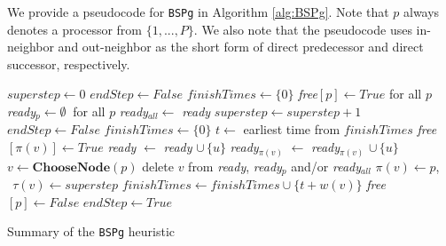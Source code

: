 \documentclass[sigconf,nonacm]{acmart}
\begin{document}
We provide a pseudocode for \texttt{BSPg} in Algorithm \ref{alg:BSPg}. Note that $p$ always denotes a processor from $\{ 1, ..., P \}$. We also note that the pseudocode uses in-neighbor and out-neighbor as the short form of direct predecessor and direct successor, respectively.

\begin{algorithm}[h!]
\begin{algorithmic}
    \STATE $superstep \leftarrow 0$
    \STATE $endStep \leftarrow False$
    \STATE $finishTimes \leftarrow \{ 0 \}$
    \STATE \textit{free}$[p] \leftarrow True$ for all $p$
            \STATE \textit{ready}$_p \leftarrow \emptyset \:$ for all $p$
            \STATE \textit{ready}$_{all} \leftarrow$ \textit{ready}
            \STATE $superstep \leftarrow superstep+1$
            \STATE $endStep \leftarrow False$
            \STATE $finishTimes \leftarrow \{ 0 \}$
        \ENDIF
        \STATE $t \leftarrow$ earliest time from $finishTimes$
            \STATE \textit{free}$[\pi(v)] \leftarrow True$
                    \STATE \textit{ready} $\leftarrow$ \textit{ready} $\cup \, \{ u \}$
                        \STATE \textit{ready}$_{\pi(v)}$ $\leftarrow$ \textit{ready}$_{\pi(v)}$ $\cup \, \{ u \}$
                    \ENDIF
                \ENDIF
            \ENDFOR
        \ENDFOR
                \STATE $v \leftarrow \mathbf{ChooseNode}(p)$
                \STATE delete $v$ from \textit{ready}, \textit{ready}$_{p}$ and/or \textit{ready}$_{all}$
                \STATE $\pi(v) \leftarrow p$, $\: \: \tau(v) \leftarrow superstep$
                \STATE $finishTimes \leftarrow finishTimes \cup \{ t+w(v) \}$
                \STATE \textit{free}$[p] \leftarrow False$
            \ENDWHILE
        \ENDIF
            \STATE \textbf{$endStep \leftarrow True$}
        \ENDIF
    \ENDWHILE
    \caption{\textsf{Summary of the \texttt{BSPg} heuristic}}
    \label{alg:BSPg}
\end{algorithmic}
\end{algorithm}
\end{document}
